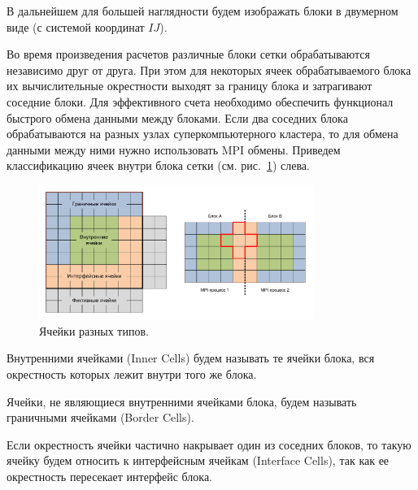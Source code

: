 В дальнейшем для большей наглядности будем изображать блоки в двумерном виде (с системой координат $IJ$).

Во время произведения расчетов различные блоки сетки обрабатываются независимо друг от друга.
При этом для некоторых ячеек обрабатываемого блока их вычислительные окрестности выходят за границу блока и затрагивают соседние блоки.
Для эффективного счета необходимо обеспечить функционал быстрого обмена данными между блоками.
Если два соседних блока обрабатываются на разных узлах суперкомпьютерного кластера, то для обмена данными между ними нужно использовать MPI обмены.
Приведем классификацию ячеек внутри блока сетки (см. рис.~\ref{fig:text_2_block_block_cells}) слева.

\begin{figure}[ht]
\centering
\includegraphics[width=0.8\textwidth]{./pics/text_2_block/4-block-cells.pdf}
\singlespacing
{}\caption{Ячейки разных типов.}
\label{fig:text_2_block_block_cells}
\end{figure}

\begin{definition}
Внутренними ячейками\label{term:cell_block_inner} (Inner Cells) будем называть те ячейки блока, вся окрестность которых лежит внутри того же блока.
\end{definition}

\begin{definition}
Ячейки, не являющиеся внутренними ячейками блока, будем называть граничными ячейками\label{term:cell_block_border} (Border Cells).
\end{definition}

\begin{definition}
Если окрестность ячейки частично накрывает один из соседних блоков, то такую ячейку будем относить к интерфейсным ячейкам\label{term:cell_block_interface} (Interface Cells), так как ее окрестность пересекает интерфейс блока.
\end{definition}

